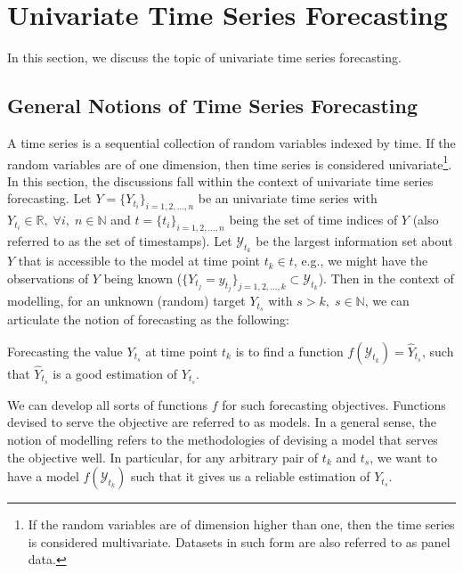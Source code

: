 \section{Univariate Time Series Forecasting}
In this section, we discuss the topic of univariate time series forecasting.

\subsection{General Notions of Time Series Forecasting}
A time series is a sequential collection of random variables indexed by time. If the random variables are of one dimension, then time series is considered univariate\footnote{If the random variables are of dimension higher than one, then the time series is considered multivariate. Datasets in such form are also referred to as panel data.}. In this section, the discussions fall within the context of univariate time series forecasting. Let $Y = \{Y_{t_i} \}_{i = 1, 2, \ldots, n}$ be an univariate time series with $ Y_{t_i} \in \mathbb{R}, \; \forall i, \; n \in \mathbb{N}$ and $t = \{t_i \}_{i = 1, 2, \ldots, n}$ being the set of time indices of $Y$ (also referred to as the set of timestamps). Let $\mathcal{Y}_{t_k}$ be the largest information set about $Y$ that is accessible to the model at time point $t_k \in t$, e.g., we might have the observations of $Y$ being known ($\{Y_{t_j} = y_{t_j}\}_{j = 1, 2, \ldots, k } \subset \mathcal{Y}_{t_k}$). Then in the context of modelling, for an unknown (random) target $Y_{t_s}$ with $s > k, \; s \in \mathbb{N}$, we can articulate the notion of forecasting as the following:
\begin{displayquote}
    Forecasting the value $Y_{t_s}$ at time point $t_k$ is to find a function $f(\mathcal{Y}_{t_k}) = \widehat{Y}_{t_s}$, such that $\widehat{Y}_{t_s}$ is a good estimation of $Y_{t_s}$.
\end{displayquote}
We can develop all sorts of functions $f$ for such forecasting objectives. Functions devised to serve the objective are referred to as models. In a general sense, the notion of modelling refers to the methodologies of devising a model that serves the objective well. In particular, for any arbitrary pair of $t_k$ and $t_s$, we want to have a model $f(\mathcal{Y}_{t_k})$ such that it gives us a reliable estimation of $Y_{t_s}$.

